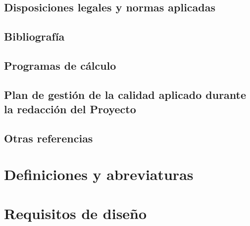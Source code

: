 \documentclass[main]{subfiles}
\begin{document}
\subsection{Disposiciones legales y normas aplicadas}

\subsection{Bibliografía}

\subsection{Programas de cálculo}

\subsection{Plan de gestión de la calidad aplicado durante la redacción del Proyecto}

\subsection{Otras referencias}

\section{Definiciones y abreviaturas}

\section{Requisitos de diseño}
\end{document}
